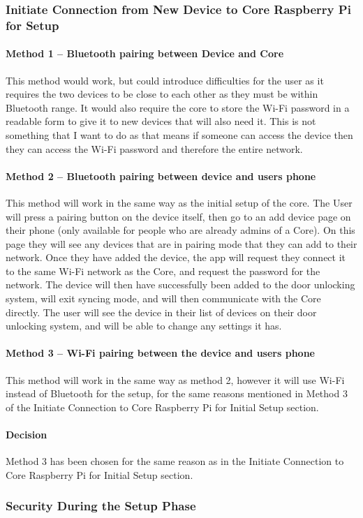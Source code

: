\subsubsection{Initiate Connection from New Device to Core Raspberry Pi for Setup}

\paragraph{Method 1 – Bluetooth pairing between Device and Core}
This method would work, but could introduce difficulties for the user as it requires the two devices to be close to each other as they must be within Bluetooth range. It would also require the core to store the Wi-Fi password in a readable form to give it to new devices that will also need it. This is not something that I want to do as that means if someone can access the device then they can access the Wi-Fi password and therefore the entire network.

\paragraph{Method 2 – Bluetooth pairing between device and users phone}
This method will work in the same way as the initial setup of the core. The User will press a pairing button on the device itself, then go to an add device page on their phone (only available for people who are already admins of a Core). On this page they will see any devices that are in pairing mode that they can add to their network. Once they have added the device, the app will request they connect it to the same Wi-Fi network as the Core, and request the password for the network. The device will then have successfully been added to the door unlocking system, will exit syncing mode, and will then communicate with the Core directly. The user will see the device in their list of devices on their door unlocking system, and will be able to change any settings it has.

\paragraph{Method 3 – Wi-Fi pairing between the device and users phone}
This method will work in the same way as method 2, however it will use Wi-Fi instead of Bluetooth for the setup, for the same reasons mentioned in Method 3 of the Initiate Connection to Core Raspberry Pi for Initial Setup section.

\paragraph{Decision}
Method 3 has been chosen for the same reason as in the Initiate Connection to Core Raspberry Pi for Initial Setup section.

\subsubsection{Security During the Setup Phase}
